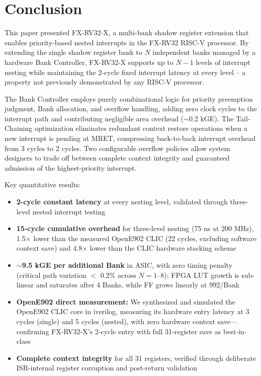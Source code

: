 \documentclass[letterpaper,journal]{IEEEtran}
\begin{document}
\section{Conclusion}

This paper presented FX-RV32-X, a multi-bank shadow register extension that enables priority-based nested interrupts in the FX-RV32 RISC-V processor.
By extending the single shadow register bank to $N$ independent banks managed by a hardware Bank Controller, FX-RV32-X supports up to $N-1$ levels of interrupt nesting while maintaining the 2-cycle fixed interrupt latency at every level -- a property not previously demonstrated by any RISC-V processor.

The Bank Controller employs purely combinational logic for priority preemption judgment, Bank allocation, and overflow handling, adding zero clock cycles to the interrupt path and contributing negligible area overhead ($\sim$0.2 kGE).
The Tail-Chaining optimization eliminates redundant context restore operations when a new interrupt is pending at MRET, compressing back-to-back interrupt overhead from 3 cycles to 2 cycles.
Two configurable overflow policies allow system designers to trade off between complete context integrity and guaranteed admission of the highest-priority interrupt.

Key quantitative results:
\begin{itemize}
\item \textbf{2-cycle constant latency} at every nesting level, validated through three-level nested interrupt testing
\item \textbf{15-cycle cumulative overhead} for three-level nesting (75 ns at 200 MHz), 1.5$\times$ lower than the measured OpenE902 CLIC (22 cycles, excluding software context save) and 4.8$\times$ lower than the CLIC hardware stacking scheme~\cite{ref5}
\item \textbf{$\sim$9.5 kGE per additional Bank} in ASIC, with zero timing penalty (critical path variation $<$ 0.2\% across $N=1$--8); FPGA LUT growth is sub-linear and saturates after 4 Banks, while FF grows linearly at 992/Bank
\item \textbf{OpenE902 direct measurement:} We synthesized and simulated the OpenE902 CLIC core in iverilog, measuring its hardware entry latency at 3 cycles (single) and 5 cycles (nested), with zero hardware context save—confirming FX-RV32-X's 2-cycle entry with full 31-register save as best-in-class
\item \textbf{Complete context integrity} for all 31 registers, verified through deliberate ISR-internal register corruption and post-return validation
\end{itemize}
\end{document}
